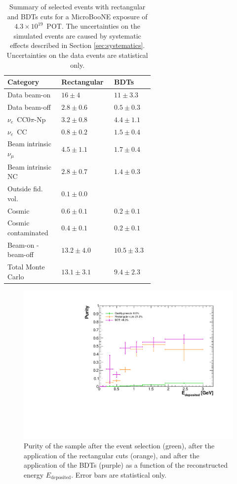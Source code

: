 \begin{table}[htbp]
   \centering
      \caption{Summary of selected events with rectangular and BDTs cuts for a MicroBooNE exposure of $4.3\times10^{19}$~POT. The uncertainties on the simulated events are caused by systematic effects described in Section \ref{sec:systematics}. Uncertainties on the data events are statistical only.}\label{tab:overview}
   \begin{tabular}{
   p{0.27\linewidth}
   >{\raggedleft\arraybackslash}p{0.16\linewidth}
   >{\raggedleft\arraybackslash}p{0.16\linewidth}}
     \toprule
     Category & Rectangular & BDTs \\
     \midrule
     Data beam-on & $16\pm4$ & $11\pm3.3$ \\
     Data beam-off & $2.8\pm0.6$ & $0.5\pm0.3$ \\
     $\nu_e$~CC0$\pi$-Np & $3.2\pm0.8$ & $4.4\pm1.1$\\
     $\nu_e$~CC & $0.8\pm0.2$ & $1.5\pm0.4$ \\
     Beam intrinsic $\nu_{\mu}$ & $4.5\pm1.1$ & $1.7\pm0.4$ \\
     Beam intrinsic NC & $2.8\pm0.7$ & $1.4\pm0.3$ \\
     Outside fid. vol. & $0.1\pm0.0$ & 0 \\
     Cosmic & $0.6\pm0.1$ & $0.2\pm0.1$ \\
     Cosmic contaminated & $0.4\pm0.1$ & $0.2\pm0.1$ \\
     \midrule
     Beam-on - beam-off & $13.2\pm4.0$ & $10.5\pm3.3$ \\
     Total Monte Carlo & $13.1\pm3.1$ & $9.4\pm2.3$ \\
     \bottomrule
   \end{tabular}
\end{table}


\begin{figure}[htbp]
\centering
  \includegraphics[width=0.75\linewidth]{figures/purity_bdt.pdf}
  \caption{Purity of the sample after the event selection (green), after the application of the rectangular cuts (orange), and after the application of the BDTs (purple) as a function of the reconstructed energy $E_{\mathrm{deposited}}$. Error bars are statistical only.}\label{fig:purity_bdt}
\end{figure}


